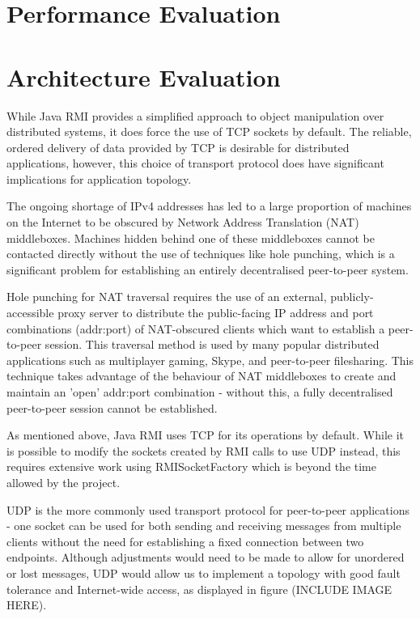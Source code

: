 \documentclass[conference]{IEEEtran}
\begin{document}
\section{Performance Evaluation}



\section{Architecture Evaluation}
While Java RMI provides a simplified approach to object manipulation over distributed systems, it does force the use of TCP sockets by default. The reliable, ordered delivery of data provided by TCP is desirable for distributed applications, however, this choice of transport protocol does have significant implications for application topology.

The ongoing shortage of IPv4 addresses has led to a large proportion of machines on the Internet to be obscured by Network Address Translation (NAT) middleboxes. Machines hidden behind one of these middleboxes cannot be contacted directly without the use of techniques like hole punching, which is a significant problem for establishing an entirely decentralised peer-to-peer system.

Hole punching for NAT traversal requires the use of an external, publicly-accessible proxy server to distribute the public-facing IP address and port combinations (addr:port) of NAT-obscured clients which want to establish a peer-to-peer session. This traversal method is used by many popular distributed applications such as multiplayer gaming, Skype, and peer-to-peer filesharing. This technique takes advantage of the behaviour of NAT middleboxes to create and maintain an 'open' addr:port combination - without this, a fully decentralised peer-to-peer session cannot be established.

As mentioned above, Java RMI uses TCP for its operations by default. While it is possible to modify the sockets created by RMI calls to use UDP instead, this requires extensive work using RMISocketFactory which is beyond the time allowed by the project.

UDP is the more commonly used transport protocol for peer-to-peer applications - one socket can be used for both sending and receiving messages from multiple clients without the need for establishing a fixed connection between two endpoints. Although adjustments would need to be made to allow for unordered or lost messages, UDP would allow us to implement a topology with good fault tolerance and Internet-wide access, as displayed in figure (INCLUDE IMAGE HERE).
\end{document}
